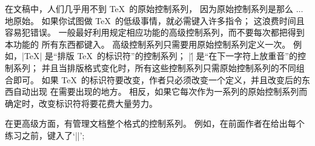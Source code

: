在文稿中，人们几乎用不到 \TeX\ 的原始控制系列，
因为原始控制系列是那么 $\ldots$ 地{原始}。%
如果你试图做 \TeX\ 的低级事情，就必需键入许多指令；
这浪费时间且容易犯错误。%
一般最好利用规定相应功能的高级控制系列，而不要每次都把得到本功能的%
所有东西都键入。%
高级控制系列只需要用原始控制系列定义一次。%
\1例如，|\TeX| 是``排版 \TeX\ 的标识符''的控制系列；
|\'| 是``在下一字符上放重音''的控制系列；
并且当排版格式变化时，所有这些控制系列只需原始控制系列的不同组合即可。%
如果 \TeX\ 的标识符要改变，作者只必须改变一个定义，并且改变后的东西自动出现%
在需要出现的地方。%
相反，如果它每次作为一系列的原始控制系列而确定时，改变标识符将要花费大量劳力。

在更高级方面，有管理文档整个格式的控制系列。%
例如，在前面作者在给出每个练习之前，键入了`|\exercise|';

